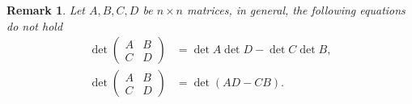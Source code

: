 \documentclass[10pt]{book}
\newtheorem{remark}{Remark}[chapter]
\theoremstyle{definition}
\numberwithin{equation}{chapter}
\begin{document}
\begin{remark}
Let $A,B,C,D$ be $n\times n$ matrices, in general, the following equations do not hold
\begin{align*}
    \det \left(
    \begin{matrix}
        A & B\\
        C & D
    \end{matrix}
    \right) & = \det A \det D - \det C \det B, \\
    \det \left(
    \begin{matrix}
        A & B\\
        C & D
    \end{matrix}
    \right)& = \det(AD - CB).
\end{align*}
\end{remark}

\medskip
\end{document}
